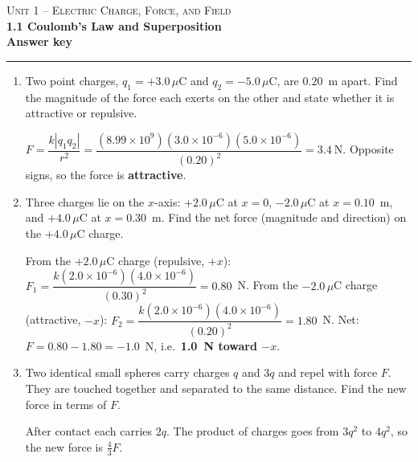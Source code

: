 \documentclass[11pt,letterpaper]{article}
\begin{document}
{\small\textsc{Unit 1 -- Electric Charge, Force, and Field}}\\[2pt]{\Large\bfseries 1.1 Coulomb's Law and Superposition}\\[8pt]\textbf{Answer key}\\[4pt]\hrule\vspace{10pt}{\small\itshape Placeholder worksheet for the site prototype. Free for classroom use.}\vspace{6pt}
\begin{enumerate}[leftmargin=*,itemsep=10pt]
\item Two point charges, $q_1 = +3.0\,\mu\text{C}$ and $q_2 = -5.0\,\mu\text{C}$, are $0.20$~m apart. Find the magnitude of the force each exerts on the other and state whether it is attractive or repulsive.
\begin{answer}$F = \dfrac{k|q_1 q_2|}{r^2} = \dfrac{(8.99\times10^{9})(3.0\times10^{-6})(5.0\times10^{-6})}{(0.20)^2} = 3.4\ \text{N}$. Opposite signs, so the force is \textbf{attractive}.\end{answer}
\item Three charges lie on the $x$-axis: $+2.0\,\mu\text{C}$ at $x=0$, $-2.0\,\mu\text{C}$ at $x=0.10$~m, and $+4.0\,\mu\text{C}$ at $x=0.30$~m. Find the net force (magnitude and direction) on the $+4.0\,\mu\text{C}$ charge.
\begin{answer}From the $+2.0\,\mu$C charge (repulsive, $+x$): $F_1 = \dfrac{k(2.0\times10^{-6})(4.0\times10^{-6})}{(0.30)^2} = 0.80$~N. From the $-2.0\,\mu$C charge (attractive, $-x$): $F_2 = \dfrac{k(2.0\times10^{-6})(4.0\times10^{-6})}{(0.20)^2} = 1.80$~N. Net: $F = 0.80 - 1.80 = -1.0$~N, i.e.\ \textbf{1.0~N toward $-x$}.\end{answer}
\item Two identical small spheres carry charges $q$ and $3q$ and repel with force $F$. They are touched together and separated to the same distance. Find the new force in terms of $F$.
\begin{answer}After contact each carries $2q$. The product of charges goes from $3q^2$ to $4q^2$, so the new force is $\tfrac{4}{3}F$.\end{answer}
\end{enumerate}
\end{document}
